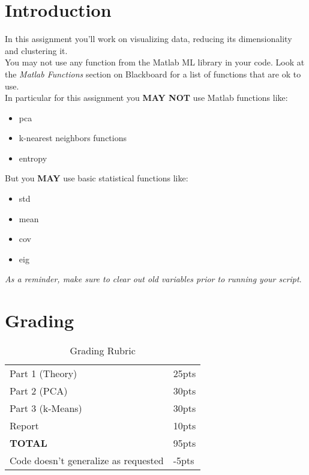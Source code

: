 \documentclass[12pt]{article}
\begin{document}
\maketitle


\section*{Introduction}
In this assignment you'll work on visualizing data, reducing its dimensionality and clustering it.\\

\noindent
You may not use any function from the Matlab ML library in your code.  Look at the \emph{Matlab Functions} section on Blackboard for a list of functions that are ok to use.\\

\noindent
In particular for this assignment you \textbf{MAY NOT} use Matlab functions like:
\begin{itemize}
\item pca
\item k-nearest neighbors functions
\item entropy
\end{itemize}

\noindent
But you \textbf{MAY} use basic statistical functions like:
\begin{itemize}
\item std
\item mean
\item cov
\item eig
\end{itemize}

\begin{center}
\emph{As a reminder, make sure to clear out old variables prior to running your script}.
\end{center}


\section*{Grading}
\begin{table}[h]
\begin{centering}
\begin{tabular}{|l|l|}
\hline
Part 1 (Theory) & 25pts \\
Part 2 (PCA) & 30pts\\
Part 3 (k-Means) & 30pts\\
Report & 10pts\\
\hline
\textbf{TOTAL} & 95pts\\
\hline
Code doesn't generalize as requested & -5pts\\
\hline
\end{tabular}
\caption{Grading Rubric}
\end{centering}
\end{table}
\end{document}
